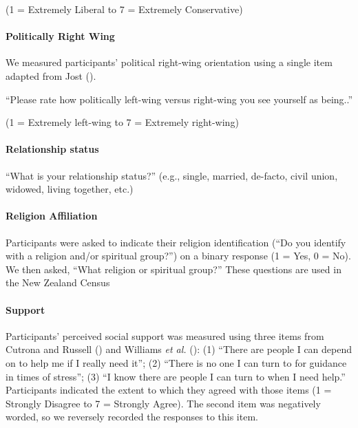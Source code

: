 \documentclass[
  singlecolumn]{article}
\let\oldparagraph\paragraph
\renewcommand{\paragraph}[1]{\oldparagraph{#1}\mbox{}}
\begin{document}
(1 = Extremely Liberal to 7 = Extremely Conservative)

\paragraph{Politically Right Wing}\label{politically-right-wing}

We measured participants' political right-wing orientation using a
single item adapted from Jost ().

``Please rate how politically left-wing versus right-wing you see
yourself as being..''

(1 = Extremely left-wing to 7 = Extremely right-wing)

\paragraph{Relationship status}\label{relationship-status}

``What is your relationship status?'' (e.g., single, married, de-facto,
civil union, widowed, living together, etc.)

\paragraph{Religion Affiliation}\label{religion-affiliation}

Participants were asked to indicate their religion identification (``Do
you identify with a religion and/or spiritual group?'') on a binary
response (1 = Yes, 0 = No). We then asked, ``What religion or spiritual
group?'' These questions are used in the New Zealand Census

\paragraph{Support}\label{support}

Participants' perceived social support was measured using three items
from Cutrona and Russell () and Williams
\emph{et al.} (): (1)
``There are people I can depend on to help me if I really need it''; (2)
``There is no one I can turn to for guidance in times of stress''; (3)
``I know there are people I can turn to when I need help.'' Participants
indicated the extent to which they agreed with those items (1 = Strongly
Disagree to 7 = Strongly Agree). The second item was negatively worded,
so we reversely recorded the responses to this item.
\end{document}
